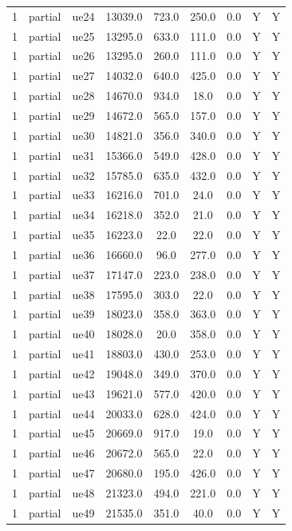 \begin{table}[ht]
\begin{tabular}{|c|c|c|c|c|c|c|c|c|}
1 & partial & ue24 & 13039.0 & 723.0 & 250.0 & 0.0 & Y & Y \\
1 & partial & ue25 & 13295.0 & 633.0 & 111.0 & 0.0 & Y & Y \\
1 & partial & ue26 & 13295.0 & 260.0 & 111.0 & 0.0 & Y & Y \\
1 & partial & ue27 & 14032.0 & 640.0 & 425.0 & 0.0 & Y & Y \\
1 & partial & ue28 & 14670.0 & 934.0 & 18.0 & 0.0 & Y & Y \\
1 & partial & ue29 & 14672.0 & 565.0 & 157.0 & 0.0 & Y & Y \\
1 & partial & ue30 & 14821.0 & 356.0 & 340.0 & 0.0 & Y & Y \\
1 & partial & ue31 & 15366.0 & 549.0 & 428.0 & 0.0 & Y & Y \\
1 & partial & ue32 & 15785.0 & 635.0 & 432.0 & 0.0 & Y & Y \\
1 & partial & ue33 & 16216.0 & 701.0 & 24.0 & 0.0 & Y & Y \\
1 & partial & ue34 & 16218.0 & 352.0 & 21.0 & 0.0 & Y & Y \\
1 & partial & ue35 & 16223.0 & 22.0 & 22.0 & 0.0 & Y & Y \\
1 & partial & ue36 & 16660.0 & 96.0 & 277.0 & 0.0 & Y & Y \\
1 & partial & ue37 & 17147.0 & 223.0 & 238.0 & 0.0 & Y & Y \\
1 & partial & ue38 & 17595.0 & 303.0 & 22.0 & 0.0 & Y & Y \\
1 & partial & ue39 & 18023.0 & 358.0 & 363.0 & 0.0 & Y & Y \\
1 & partial & ue40 & 18028.0 & 20.0 & 358.0 & 0.0 & Y & Y \\
1 & partial & ue41 & 18803.0 & 430.0 & 253.0 & 0.0 & Y & Y \\
1 & partial & ue42 & 19048.0 & 349.0 & 370.0 & 0.0 & Y & Y \\
1 & partial & ue43 & 19621.0 & 577.0 & 420.0 & 0.0 & Y & Y \\
1 & partial & ue44 & 20033.0 & 628.0 & 424.0 & 0.0 & Y & Y \\
1 & partial & ue45 & 20669.0 & 917.0 & 19.0 & 0.0 & Y & Y \\
1 & partial & ue46 & 20672.0 & 565.0 & 22.0 & 0.0 & Y & Y \\
1 & partial & ue47 & 20680.0 & 195.0 & 426.0 & 0.0 & Y & Y \\
1 & partial & ue48 & 21323.0 & 494.0 & 221.0 & 0.0 & Y & Y \\
1 & partial & ue49 & 21535.0 & 351.0 & 40.0 & 0.0 & Y & Y \\

\end{tabular}
\end{table}
